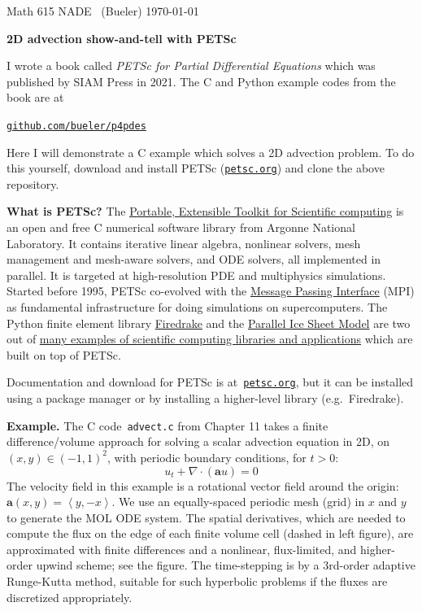 \documentclass[11pt]{amsart}
\newcommand{\normalspacing}{\renewcommand{\baselinestretch}{1.05}
        \tiny\normalsize}
\begin{document}
\scriptsize%
\noindent Math 615 NADE \, (Bueler) \hfill  \today
\normalsize\bigskip
\normalspacing

\Large\centerline{\textbf{2D advection show-and-tell with \textbf{PETSc}}}
\normalsize

\bigskip
\thispagestyle{empty}
\normalspacing

\renewcommand{\labelenumi}{\arabic{enumi}.\,}


\bigskip
\noindent I wrote a book called \emph{PETSc for Partial Differential Equations} which was published by SIAM Press in 2021.  The C and Python example codes from the book are at

\centerline{\href{https://github.com/bueler/p4pdes}{\texttt{github.com/bueler/p4pdes}}}

\noindent Here I will demonstrate a C example which solves a 2D advection problem.  To do this yourself, download and install PETSc (\href{https://petsc.org/}{\texttt{petsc.org}}) and clone the above repository.

\medskip
\noindent \textbf{What is PETSc?}  The \href{https://petsc.org/}{\underline{P}ortable, \underline{E}xtensible \underline{T}oolkit for \underline{S}cientific \underline{c}omputing} is an open and free C numerical software library from Argonne National Laboratory.  It contains iterative linear algebra, nonlinear solvers, mesh management and mesh-aware solvers, and ODE solvers, all implemented in parallel.  It is targeted at high-resolution PDE and multiphysics simulations.  Started before 1995, PETSc co-evolved with the \href{https://www.mpich.org/}{Message Passing Interface} (MPI) as fundamental infrastructure for doing simulations on supercomputers.  The Python finite element library \href{https://www.firedrakeproject.org/}{Firedrake} and the \href{https://www.pism.io/}{Parallel Ice Sheet Model} are two out of \href{https://petsc.org/release/#toolkits-libraries-that-use-petsc}{many examples of scientific computing libraries and applications} which are built on top of PETSc.

Documentation and download for PETSc is at \,\href{https://petsc.org/}{\texttt{petsc.org}}, but it can be installed using a package manager or by installing a higher-level library (e.g.~Firedrake).

\bigskip
\noindent \textbf{Example.}  The C code \,\texttt{advect.c} from Chapter 11 takes a finite difference/volume approach for solving a scalar advection equation in 2D, on $(x,y) \in (-1,1)^2$, with periodic boundary conditions, for $t>0$:
    $$u_t + \nabla \cdot (\mathbf{a} u) = 0$$
The velocity field in this example is a rotational vector field around the origin: $\mathbf{a}(x,y) = \left<y, -x\right>$.  We use an equally-spaced periodic mesh (grid) in $x$ and $y$ to generate the MOL ODE system.  The spatial derivatives, which are needed to compute the flux on the edge of each finite volume cell (dashed in left figure), are approximated with finite differences and a nonlinear, flux-limited, and higher-order upwind scheme; see the figure.  The time-stepping is by a 3rd-order adaptive Runge-Kutta method, suitable for such hyperbolic problems if the fluxes are discretized appropriately.
\end{document}
